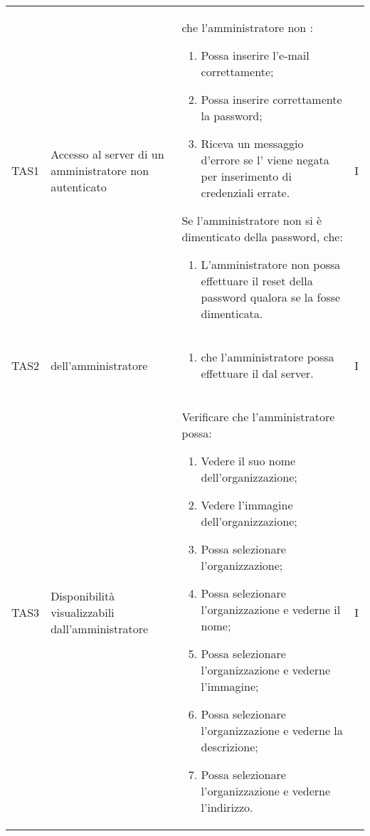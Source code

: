 {\begin{longtable}{ c  C{2.5cm}  C{10cm} C{1cm}}
TAS1 & Accesso al server di un amministratore non autenticato & 
 che l'amministratore non :
\begin{enumerate}
    \item Possa inserire l'e-mail correttamente;
    \item Possa inserire correttamente la password;
    \item Riceva un messaggio d'errore se l' viene negata per inserimento di credenziali errate.
\end{enumerate}
Se l'amministratore non  si è dimenticato della password,  che:
\begin{enumerate}[resume]
    \item L'amministratore non  possa effettuare il reset della password qualora se la fosse dimenticata.
\end{enumerate} & I \\

TAS2 &  dell'amministratore  & \begin{enumerate}
    \item {} che l'amministratore  possa effettuare il  dal server.
\end{enumerate} & I \\

TAS3 & Disponibilità  visualizzabili dall'amministratore &
Verificare che l'amministratore possa:
\begin{enumerate}
    \item Vedere il suo nome dell'organizzazione;
    \item Vedere l'immagine dell'organizzazione;
    \item Possa selezionare l'organizzazione;
    \item Possa selezionare l'organizzazione e vederne il nome;
    \item Possa selezionare l'organizzazione e vederne l'immagine;
    \item Possa selezionare l'organizzazione e vederne la descrizione;
    \item Possa selezionare l'organizzazione e vederne l'indirizzo.
\end{enumerate} & I \\


\end{longtable}}
